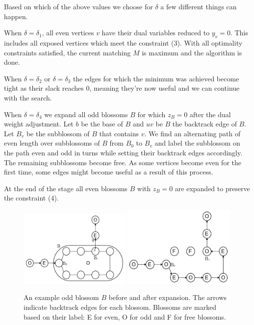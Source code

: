 Based on which of the above values we choose for $\delta$ a few different things can happen.

When $\delta = \delta_1$, all even vertices $v$ have their dual variables reduced to $y_v = 0$. This includes all exposed vertices which meet the constraint (3). With all optimality constraints satisfied, the current matching $M$ is maximum and the algorithm is done.

When $\delta = \delta_2$ or $\delta = \delta_3$ the edges for which the minimum was achieved become tight as their slack reaches $0$, meaning they're now useful and we can continue with the search.

When $\delta = \delta_4$ we expand all odd blossoms $B$ for which $z_B = 0$ after the dual weight adjustment. Let $b$ be the base of $B$ and $uv$ be $B$ the backtrack edge of $B$. Let $B_v$ be the subblossom of $B$ that contains $v$. We find an alternating path of even length over subblossoms of $B$ from $B_0$ to $B_v$ and label the subblossom on the path even and odd in turns while setting their backtrack edges accordingly. The remaining subblossoms become free. As some vertices become even for the first time, some edges might become useful as a result of this process.

At the end of the stage all even blossoms $B$ with $z_B = 0$ are expanded to preserve the constraint (4).

\begin{figure}[t]
    \centering
    \includegraphics*[width=0.49\textwidth]{figures/Odd expansion.png}
    \includegraphics*[width=0.49\textwidth]{figures/Odd expanded.png}
    \caption{An example odd blossom $B$ before and after expansion. The arrows indicate backtrack edges for each blossom. Blossoms are marked based on their label: E for even, O for odd and F for free blossoms.}
\end{figure}

